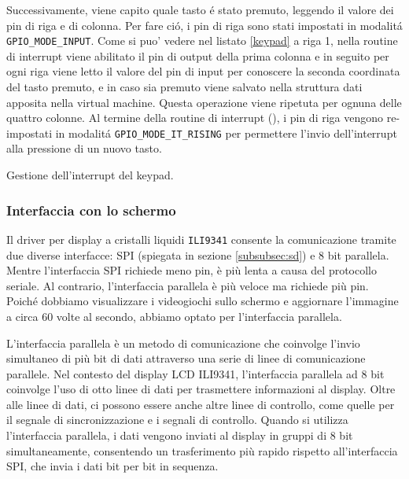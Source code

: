 \documentclass[a4paper]{article}
\begin{document}
Successivamente, viene capito quale tasto é stato premuto, leggendo il valore dei pin di riga e di colonna. Per fare ció, i pin di riga sono stati impostati in modalitá \texttt{GPIO\_MODE\_INPUT}. Come si puo' vedere nel listato \ref{keypad} a riga 1, nella routine di interrupt viene abilitato il pin di output della prima colonna e in seguito per ogni riga viene letto il valore del pin di input per conoscere la seconda coordinata del tasto premuto, e in caso sia premuto viene salvato nella struttura dati apposita nella virtual machine. Questa operazione viene ripetuta per ognuna delle quattro colonne.
Al termine della routine di interrupt ({}), i pin di riga vengono re-impostati in modalitá \texttt{GPIO\_MODE\_IT\_RISING} per permettere l'invio dell'interrupt alla pressione di un nuovo tasto.

\begin{Listing}[h!t] %
    \centering
    \caption{Gestione dell'interrupt del keypad.}
    \label{keypad}
\end{Listing}

\subsubsection{Interfaccia con lo schermo}

Il driver per display a cristalli liquidi \texttt{ILI9341} consente la comunicazione tramite due diverse interfacce: SPI (spiegata in sezione \ref{subsubsec:sd}) e 8 bit parallela. Mentre l'interfaccia SPI richiede meno pin, è più lenta a causa del protocollo seriale. Al contrario, l'interfaccia parallela è più veloce ma richiede più pin. Poiché dobbiamo visualizzare i videogiochi sullo schermo e aggiornare l'immagine a circa 60 volte al secondo, abbiamo optato per l'interfaccia parallela.

L'interfaccia parallela è un metodo di comunicazione che coinvolge l'invio simultaneo di più bit di dati attraverso una serie di linee di comunicazione parallele. Nel contesto del display LCD ILI9341, l'interfaccia parallela ad 8 bit coinvolge l'uso di otto linee di dati per trasmettere informazioni al display. Oltre alle linee di dati, ci possono essere anche altre linee di controllo, come quelle per il segnale di sincronizzazione e i segnali di controllo. Quando si utilizza l'interfaccia parallela, i dati vengono inviati al display in gruppi di 8 bit simultaneamente, consentendo un trasferimento più rapido rispetto all'interfaccia SPI, che invia i dati bit per bit in sequenza.
\end{document}
